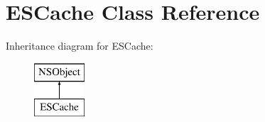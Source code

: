 \hypertarget{interface_e_s_cache}{}\section{E\+S\+Cache Class Reference}
\label{interface_e_s_cache}
Inheritance diagram for E\+S\+Cache\+:\begin{figure}[H]
\begin{center}
\leavevmode
\includegraphics[height=2.000000cm]{interface_e_s_cache}
\end{center}
\end{figure}

